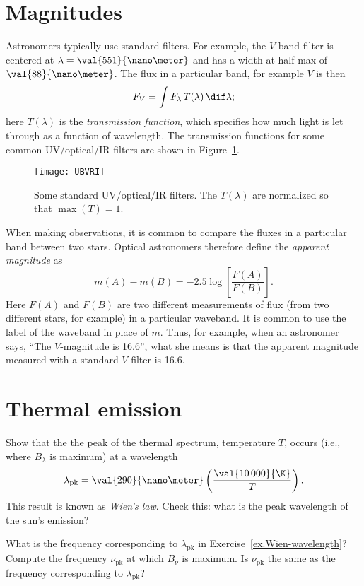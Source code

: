 \section{Magnitudes}
\label{s.magnitudes}

Astronomers typically use standard filters. For example, the $V$-band filter is centered at $\lambda=\val{551}{\nano\meter}$ and has a width at half-max of $\val{88}{\nano\meter}$. The flux in a particular band, for example $V$ is then
\[
	F_{V} = \int F_{\lambda} \, T(\lambda)\,\dif\lambda;
\]
here $T(\lambda)$ is the \emph{transmission function}, which specifies how much light is let through as a function of wavelength.  The transmission functions for some common UV/optical/IR filters are shown in Figure~\ref{f.UBVRI}.
\begin{figure}
\texttt{[image: UBVRI]}
\caption[Standard filters]{\label{f.UBVRI} Some standard UV/optical/IR filters. The $T(\lambda)$ are normalized so that $\max(T)=1$.}
\end{figure}

When making observations, it is common to compare the fluxes in a particular band between two stars. Optical astronomers therefore define the \emph{apparent magnitude} as
\begin{equation}\label{e.apparent-magnitude}
m(A) - m(B) = -2.5\log\left[\frac{F(A)}{F(B)}\right].
\end{equation}
Here $F(A)$ and $F(B)$ are two different measurements of flux (from two different stars, for example) in a particular waveband. It is common to use the label of the waveband in place of $m$. Thus, for example, when an astronomer says, ``The $V$-magnitude is 16.6'', what she means is that the apparent magnitude measured with a standard $V$-filter is 16.6.

\section{Thermal emission}
\label{s.thermal-emission}

\begin{exercisebox}\label{ex.Wien-wavelength}
Show that the the peak of the thermal spectrum, temperature $T$, occurs (i.e., where $B_{\lambda}$ is maximum) at a wavelength
\[ \lambda_{\mathrm{pk}} = \val{290}{\nano\meter}\left(\frac{\val{10\,000}{\K}}{T}\right). \]
This result is known as \emph{Wien's law}. Check this: what is the peak wavelength of the sun's emission?  
\end{exercisebox}

\begin{exercisebox}
What is the frequency corresponding to $\lambda_{\mathrm{pk}}$ in Exercise~\ref{ex.Wien-wavelength}? Compute the frequency $\nu_{\mathrm{pk}}$ at which $B_{\nu}$ is maximum. Is $\nu_{\mathrm{pk}}$ the same as the frequency corresponding to $\lambda_{\mathrm{pk}}$?
\end{exercisebox}

